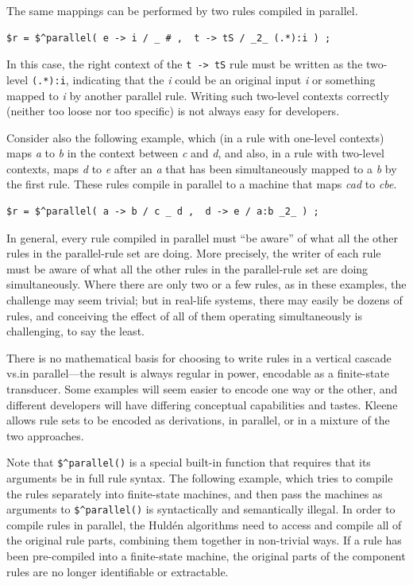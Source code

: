 \noindent
The same mappings can be performed by two rules compiled in parallel.

\begin{Verbatim}
$r = $^parallel( e -> i / _ # ,  t -> tS / _2_ (.*):i ) ;
\end{Verbatim}

\noindent
In this case, the right context of the \texttt{t -> tS} rule must be written as the
two-level \texttt{(.*):i}, indicating that the \emph{i} could be an original input
\emph{i} or something mapped to \emph{i} by another parallel rule.  Writing such two-level
contexts correctly (neither too loose nor too specific) is not always easy for developers.  

Consider also the following example, which (in a rule with one-level contexts) maps
\emph{a} to \emph{b} in the context between \emph{c} and
\emph{d}, and also, in a rule with two-level contexts, maps \emph{d} to \emph{e} after an
\emph{a} that has been simultaneously mapped to a \emph{b} by the first rule.  These rules compile
in parallel to a machine that maps \emph{cad} to \emph{cbe}.

\begin{Verbatim}
$r = $^parallel( a -> b / c _ d ,  d -> e / a:b _2_ ) ;
\end{Verbatim}

In general, every rule compiled in parallel must ``be aware'' of what all the other rules
in the parallel-rule set are doing.  More precisely, the writer of each rule must be aware of
what all the other rules in the parallel-rule set are doing
simultaneously.  Where there are only two or a few rules,
as in these examples, the challenge may seem trivial; but in real-life systems, there may
easily be
dozens of rules, and conceiving the effect of all of them operating simultaneously is
challenging, to say the least.

There is no mathematical basis for choosing to write rules in a vertical cascade vs.\@ in
parallel---the result is always regular in power, encodable as a finite-state transducer.
Some examples will seem easier to encode one way or the other, and different developers
will have differing conceptual capabilities and tastes.  Kleene allows rule sets to be
encoded as derivations, in parallel, or in a mixture of the two approaches.

Note that \verb!$^parallel()! is a special built-in function that requires that its arguments be in full rule syntax.  The following example, which
tries to compile the rules separately into finite-state machines, and then pass
the machines as arguments to \verb!$^parallel()! is syntactically and
semantically
illegal.  In order to compile rules in parallel, the Huld\'en algorithms need to access
and compile all of the original rule parts,
combining them together in non-trivial ways.  If a rule has been pre-compiled into a finite-state machine, the original parts of
the component rules are no longer identifiable or extractable.

